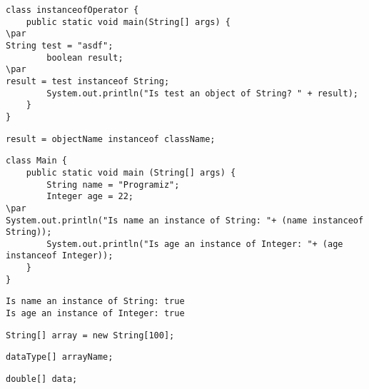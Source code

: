\documentclass{book}
\def\lthtmlcheckvsize{\ifdim\ht\sizebox<\vsize 
  \ifdim\wd\sizebox<\hsize\expandafter\hfill\fi \expandafter\vfill
  \else\expandafter\vss\fi}%
\begin{document}
{\newpage\clearpage
{}%
\begin{lstlisting}
class instanceofOperator {
    public static void main(String[] args) {
\par
String test = "asdf";
        boolean result;
\par
result = test instanceof String;
        System.out.println("Is test an object of String? " + result);
    }
}
\end{lstlisting}%
\lthtmlfigureZ
\lthtmlcheckvsize\clearpage}

{\newpage\clearpage
{}%
\begin{lstlisting}
result = objectName instanceof className;
\end{lstlisting}%
\lthtmlfigureZ
\lthtmlcheckvsize\clearpage}

{\newpage\clearpage
{}%
\begin{lstlisting}
class Main {
    public static void main (String[] args) {
        String name = "Programiz";
        Integer age = 22;
\par
System.out.println("Is name an instance of String: "+ (name instanceof String));
        System.out.println("Is age an instance of Integer: "+ (age instanceof Integer));
    }
}
\end{lstlisting}%
\lthtmlfigureZ
\lthtmlcheckvsize\clearpage}

{\newpage\clearpage
{}%
\begin{lstlisting}
Is name an instance of String: true
Is age an instance of Integer: true
\end{lstlisting}%
\lthtmlfigureZ
\lthtmlcheckvsize\clearpage}

{\newpage\clearpage
{}%
\begin{lstlisting}
String[] array = new String[100];
\end{lstlisting}%
\lthtmlfigureZ
\lthtmlcheckvsize\clearpage}

{\newpage\clearpage
{}%
\begin{lstlisting}
dataType[] arrayName;
\end{lstlisting}%
\lthtmlfigureZ
\lthtmlcheckvsize\clearpage}

{\newpage\clearpage
{}%
\begin{lstlisting}
double[] data;
\end{lstlisting}%
\lthtmlfigureZ
\lthtmlcheckvsize\clearpage}
\end{document}
